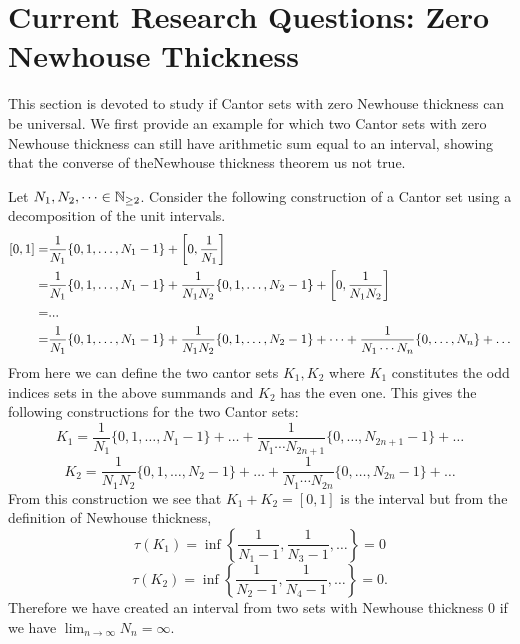 \section{Current Research Questions: Zero Newhouse Thickness} 
This section is devoted to study  if Cantor sets with zero Newhouse thickness can be universal. We first  provide an example for  which two Cantor sets with zero Newhouse thickness can still have arithmetic sum equal  to an interval,  showing that the converse of theNewhouse thickness theorem us  not true.   %
\begin{example}
{\rm Let $N_1, N_2, \dots \in \mathbb{N}_{\geq 2}$. Consider the following construction of a Cantor set using a decomposition of the unit intervals. }
$$\begin{aligned}
    \relax[0,1] = &\frac{1}{N_1}\{0,1, \dots, N_1-1\} + \left[0,\frac{1}{N_1}\right]\\
    = & \frac{1}{N_1}\{0,1, \dots, N_1-1\} + \frac{1}{N_1 N_2}\{0,1, \dots, N_2-1\} + \left[0,\frac{1}{N_1 N_2}\right]\\
    =&...\\
    =&\frac{1}{N_1}\{0,1, \dots, N_1-1\} +  \frac{1}{N_1 N_2}\{0,1, \dots, N_2-1\} + \dots + \frac{1}{N_1 \cdots N_n} \{0,\dots, N_n \}+ \dots
\end{aligned}$$
{\rm From here we can define the two cantor sets $K_1, K_2$ where $K_1$ constitutes the odd indices sets in the above summands and $K_2$ has the even one.   This gives the following constructions for the two Cantor sets: }
$$K_1 = \frac{1}{N_1}\{0,1, \dots, N_1-1\}  + \dots + \frac{1}{N_1 \cdots N_{2n+1}} \{0,\dots, N_{2n+1}-1 \}+ \dots$$
$$K_2 = \frac{1}{N_1N_2}\{0,1, \dots, N_2-1\}  + \dots +\frac{1}{N_1 \cdots N_{2n}} \{0,\dots, N_{2n}-1 \}+ \dots$$
{\rm From this construction we see that $K_1 + K_2 = [0,1]$ is the interval but from the definition of Newhouse thickness, }
$$\tau(K_1) = \inf \left\{\frac{1}{N_1-1}, \frac{1}{N_3-1},\dots\right\} = 0 $$
$$\tau(K_2) = \inf \left\{\frac{1}{N_2-1}, \frac{1}{N_4-1},\dots\right\} = 0.$$
{\rm Therefore we have created an interval from two sets with Newhouse thickness $0$ if we have $\lim_{n\to\infty} N_n = \infty$. }
\end{example}
\vspace{0.5cm}  

